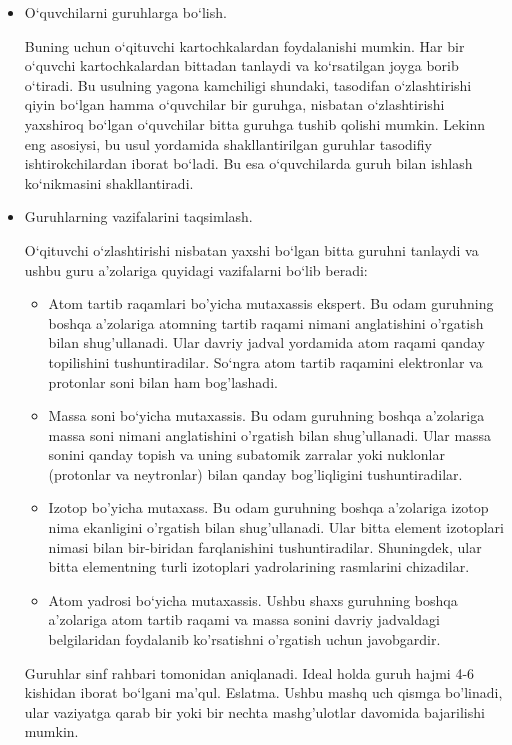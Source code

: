 \documentclass[epsf]{article}
\begin{document}
\begin{itemize}
	\item 

O`quvchilarni guruhlarga bo`lish.

Buning uchun o`qituvchi kartochkalardan foydalanishi mumkin. Har bir o`quvchi kartochkalardan bittadan tanlaydi va ko`rsatilgan joyga borib o`tiradi. Bu usulning yagona kamchiligi shundaki, tasodifan o`zlashtirishi qiyin bo`lgan hamma o`quvchilar bir guruhga, nisbatan o`zlashtirishi yaxshiroq bo`lgan o`quvchilar bitta guruhga tushib qolishi mumkin. Lekinn eng asosiysi, bu usul yordamida shakllantirilgan guruhlar tasodifiy ishtirokchilardan iborat bo`ladi. Bu esa o`quvchilarda guruh bilan ishlash ko`nikmasini shakllantiradi. 
\item Guruhlarning vazifalarini taqsimlash.

O`qituvchi o`zlashtirishi nisbatan yaxshi bo`lgan bitta guruhni tanlaydi va ushbu guru a'zolariga quyidagi vazifalarni bo`lib beradi:
\begin{itemize}
\item Atom tartib raqamlari bo'yicha mutaxassis ekspert.
Bu odam guruhning boshqa a'zolariga atomning tartib raqami nimani anglatishini o'rgatish bilan shug'ullanadi. Ular davriy jadval yordamida atom raqami qanday topilishini tushuntiradilar. So`ngra atom tartib raqamini elektronlar va protonlar soni bilan ham bog'lashadi.
\item 
Massa soni bo`yicha mutaxassis. 
Bu odam guruhning boshqa a'zolariga massa soni nimani anglatishini o'rgatish bilan shug'ullanadi. Ular massa sonini qanday topish va uning subatomik zarralar yoki nuklonlar (protonlar va neytronlar) bilan qanday bog'liqligini tushuntiradilar.
\item 
Izotop bo'yicha mutaxass.
Bu odam guruhning boshqa a'zolariga izotop nima ekanligini o'rgatish bilan shug'ullanadi. Ular bitta element izotoplari nimasi bilan bir-biridan  farqlanishini tushuntiradilar. Shuningdek, ular bitta elementning turli izotoplari yadrolarining rasmlarini chizadilar.

\item Atom yadrosi bo`yicha mutaxassis.
Ushbu shaxs guruhning boshqa a'zolariga atom tartib raqami va massa sonini davriy jadvaldagi belgilaridan foydalanib ko'rsatishni o'rgatish uchun javobgardir.
\end{itemize}
Guruhlar sinf rahbari tomonidan aniqlanadi. Ideal holda guruh hajmi 4-6 kishidan iborat bo`lgani ma'qul.
Eslatma. Ushbu mashq uch qismga bo'linadi, ular vaziyatga qarab bir yoki bir nechta mashg'ulotlar davomida bajarilishi mumkin.


\end{itemize}
\end{document}
